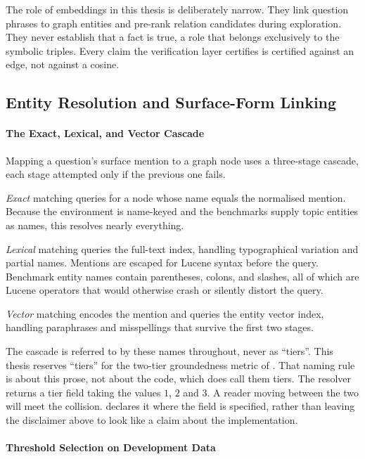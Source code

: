 The role of embeddings in this thesis is deliberately narrow. They link question
phrases to graph entities and pre-rank relation candidates during exploration.
They never establish that a fact is true, a role that belongs exclusively to the
symbolic triples. Every claim the verification layer certifies is certified
against an edge, not against a cosine.

\subsection{Entity Resolution and Surface-Form
Linking}\label{sec:entity-resolution}

\paragraph{The Exact, Lexical, and Vector Cascade}

Mapping a question's surface mention to a graph node uses a three-stage cascade,
each stage attempted only if the previous one fails.

\emph{Exact} matching queries for a node whose \textsf{name} equals the
normalised mention. Because the environment is name-keyed and the benchmarks
supply topic entities as names, this resolves nearly everything.

\emph{Lexical} matching queries the full-text index, handling typographical
variation and partial names. Mentions are escaped for Lucene syntax before the
query. Benchmark entity names contain parentheses, colons, and slashes, all of
which are Lucene operators that would otherwise crash or silently distort the
query.

\emph{Vector} matching encodes the mention and queries the entity vector index,
handling paraphrases and misspellings that survive the first two stages.

The cascade is referred to by these names throughout, never as ``tiers''. This
thesis reserves ``tiers'' for the two-tier groundedness metric of
. That naming rule is about this prose, not about
the code, which does call them tiers. The resolver returns a \textsf{tier} field
taking the values $1$, $2$ and $3$. A reader moving between the two will meet
the collision.  declares it where the field is specified,
rather than leaving the disclaimer above to look like a claim about the
implementation.

\paragraph{Threshold Selection on Development Data}

